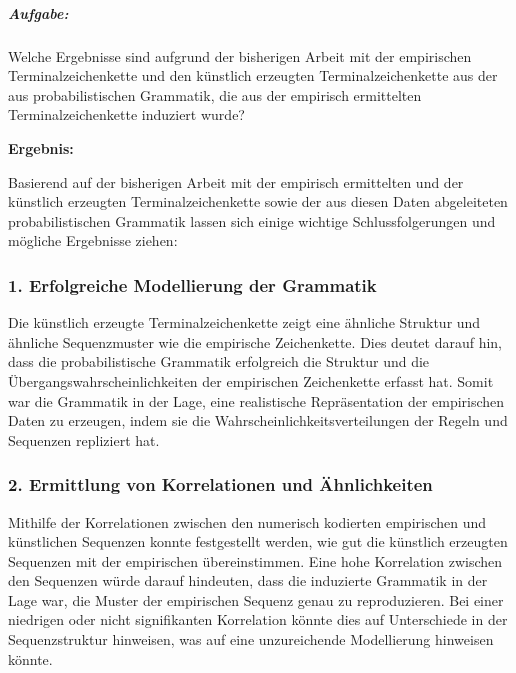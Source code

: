 \documentclass[
]{article}
\begin{document}
\subparagraph{\texorpdfstring{
\textbf{Aufgabe:}}{ Aufgabe:}}\label{aufgabe-1}

Welche Ergebnisse sind aufgrund der bisherigen Arbeit mit der
empirischen Terminalzeichenkette und den künstlich erzeugten
Terminalzeichenkette aus der aus probabilistischen Grammatik, die aus
der empirisch ermittelten Terminalzeichenkette induziert wurde?

\textbf{Ergebnis:}

Basierend auf der bisherigen Arbeit mit der empirisch ermittelten und
der künstlich erzeugten Terminalzeichenkette sowie der aus diesen Daten
abgeleiteten probabilistischen Grammatik lassen sich einige wichtige
Schlussfolgerungen und mögliche Ergebnisse ziehen:

\subsubsection{\texorpdfstring{\textbf{1. Erfolgreiche Modellierung der
Grammatik}}{1. Erfolgreiche Modellierung der Grammatik}}\label{erfolgreiche-modellierung-der-grammatik}

Die künstlich erzeugte Terminalzeichenkette zeigt eine ähnliche Struktur
und ähnliche Sequenzmuster wie die empirische Zeichenkette. Dies deutet
darauf hin, dass die probabilistische Grammatik erfolgreich die Struktur
und die Übergangswahrscheinlichkeiten der empirischen Zeichenkette
erfasst hat. Somit war die Grammatik in der Lage, eine realistische
Repräsentation der empirischen Daten zu erzeugen, indem sie die
Wahrscheinlichkeitsverteilungen der Regeln und Sequenzen repliziert hat.

\subsubsection{\texorpdfstring{\textbf{2. Ermittlung von Korrelationen
und
Ähnlichkeiten}}{2. Ermittlung von Korrelationen und Ähnlichkeiten}}\label{ermittlung-von-korrelationen-und-uxe4hnlichkeiten}

Mithilfe der Korrelationen zwischen den numerisch kodierten empirischen
und künstlichen Sequenzen konnte festgestellt werden, wie gut die
künstlich erzeugten Sequenzen mit der empirischen übereinstimmen. Eine
hohe Korrelation zwischen den Sequenzen würde darauf hindeuten, dass die
induzierte Grammatik in der Lage war, die Muster der empirischen Sequenz
genau zu reproduzieren. Bei einer niedrigen oder nicht signifikanten
Korrelation könnte dies auf Unterschiede in der Sequenzstruktur
hinweisen, was auf eine unzureichende Modellierung hinweisen könnte.
\end{document}
